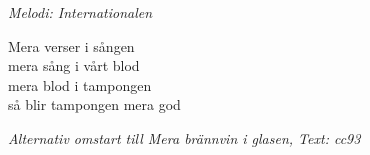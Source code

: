 {\footnotesize\textit{Melodi: Internationalen}}\par
\vspace{10pt}
Mera verser i sången\\
mera sång i vårt blod\\
mera blod i tampongen\\
så blir tampongen mera god
\par
\vspace{10pt}
{\footnotesize\textit{Alternativ omstart till Mera brännvin i glasen, Text: cc93}}
